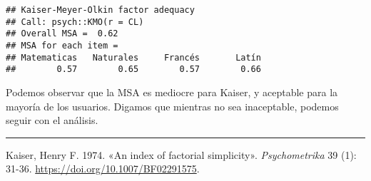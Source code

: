 \documentclass[11pt,spanish,]{article}
\begin{document}
\begin{verbatim}
## Kaiser-Meyer-Olkin factor adequacy
## Call: psych::KMO(r = CL)
## Overall MSA =  0.62
## MSA for each item = 
## Matematicas   Naturales     Francés       Latín 
##        0.57        0.65        0.57        0.66
\end{verbatim}

Podemos observar que la MSA es mediocre para Kaiser, y aceptable para la
mayoría de los usuarios. Digamos que mientras no sea inaceptable,
podemos seguir con el análisis.

\begin{center}\rule{0.5\linewidth}{\linethickness}\end{center}

\hypertarget{refs}{}
\leavevmode\hypertarget{ref-Kaiser1974}{}%
Kaiser, Henry F. 1974. «An index of factorial simplicity».
\emph{Psychometrika} 39 (1): 31-36.
\url{https://doi.org/10.1007/BF02291575}.
\end{document}
